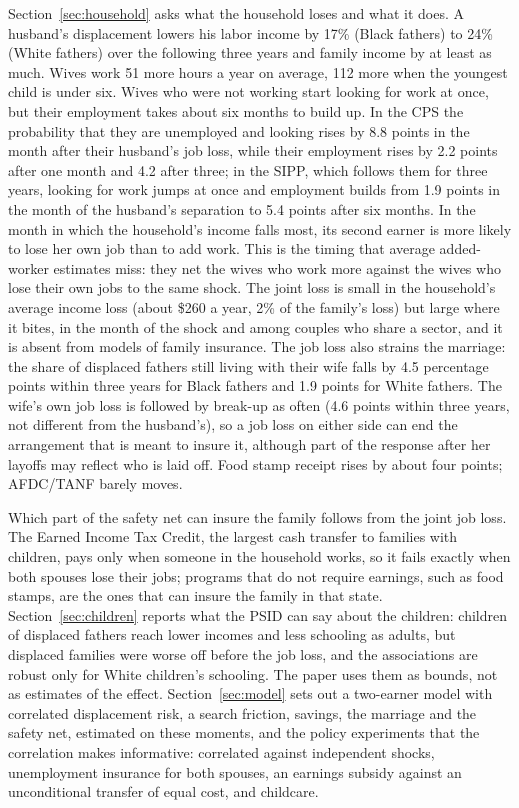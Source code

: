 Section~\ref{sec:household} asks what the household loses and what it does. A husband's displacement lowers his labor
income by 17\% (Black fathers) to 24\% (White fathers) over the following three years and family income by at least as
much. Wives work 51 more hours a year on average, 112 more when the youngest child is under six. Wives who were not
working start looking for work at once, but their employment takes about six months to build up. In the CPS the
probability that they are unemployed and looking rises by 8.8 points in the month after their husband's job loss, while
their employment rises by 2.2 points after one month and 4.2 after three; in the SIPP, which follows them for three
years, looking for work jumps at once and employment builds from 1.9 points in the month of the husband's separation to
5.4 points after six months. In the month in which the household's income falls most, its second earner is
more likely to lose her own job than to add work. This is the timing that average added-worker estimates miss: they
net the wives who work more against the wives who lose their own jobs to the same shock. The joint loss is small in
the household's average income loss (about \$260 a year, 2\% of the family's loss) but large where it bites, in the
month of the shock and among couples who share a sector, and it is absent from models of family insurance. The job
loss also strains the marriage: the share of displaced fathers still living with their wife falls by 4.5 percentage
points within three years for Black fathers and 1.9 points for White fathers. The wife's own job loss is followed by
break-up as often (4.6 points within three years, not different from the husband's), so a job loss on either side can
end the arrangement that is meant to insure it, although part of the response after her layoffs may reflect who is
laid off. Food stamp receipt rises by about four
points; AFDC/TANF barely moves.

Which part of the safety net can insure the family follows from the joint job loss. The Earned Income Tax Credit, the
largest cash transfer to families with children, pays only when someone in the household works, so it fails exactly
when both spouses lose their jobs; programs that do not require earnings, such as food stamps, are the ones that can
insure the family in that state. Section~\ref{sec:children} reports what the PSID can say about the children: children
of displaced fathers reach lower incomes and less schooling as adults, but displaced families were worse off before the
job loss, and the associations are robust only for White children's schooling. The paper uses them as bounds, not as
estimates of the effect. Section~\ref{sec:model} sets out a two-earner model with correlated displacement risk, a
search friction, savings, the marriage and the safety net, estimated on these moments, and the policy experiments that
the correlation makes informative: correlated against independent shocks, unemployment insurance for both spouses, an
earnings subsidy against an unconditional transfer of equal cost, and childcare.

